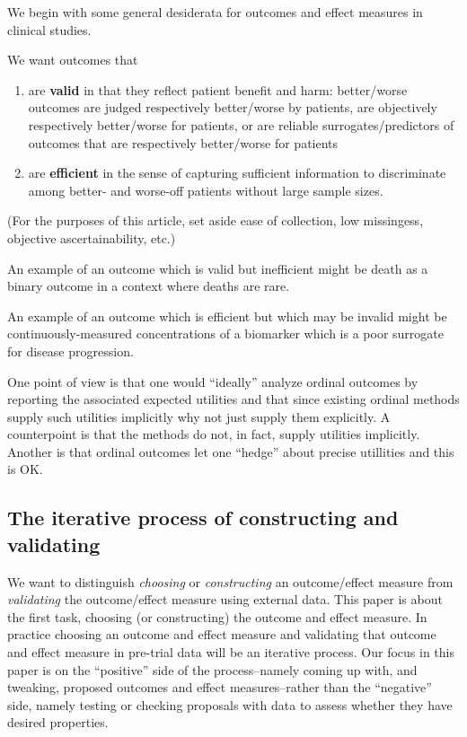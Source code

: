 \documentclass[
  11pt,
  fleqn
]{article}
\begin{document}
We begin with some general desiderata for outcomes and effect measures in
clinical studies.

We want outcomes that
\begin{enumerate}
  \item are \textbf{valid} in that they reflect patient benefit and harm:
    better/worse outcomes are judged respectively better/worse by patients, are
    objectively respectively better/worse for patients, or are reliable
    surrogates/predictors of outcomes that are respectively better/worse for
    patients
  \item are \textbf{efficient} in the sense of capturing
    sufficient information to
    discriminate among better- and worse-off patients without large
    sample sizes.
\end{enumerate}
(For the purposes of this article, set aside ease of collection, low
missingess, objective ascertainability, etc.)

An example of an outcome which is valid but inefficient might be
death as a binary outcome in a context where deaths
are rare.

An example of an outcome which is efficient but which may be invalid
might be continuously-measured concentrations of a biomarker which is a poor
surrogate for disease progression.

One point of view is that one would ``ideally'' analyze ordinal outcomes by
reporting the associated expected utilities  and that since existing ordinal methods supply
such utilities implicitly why not just supply them explicitly. A counterpoint
is that the methods do not, in fact, supply utilities implicitly.
Another is that ordinal outcomes let one ``hedge'' about precise
utillities and this is OK.

\subsection{The iterative process of constructing and validating}

We want to distinguish \emph{choosing} or \emph{constructing} an outcome/effect
measure from \emph{validating} the outcome/effect measure using external data.
This paper is about the first task, choosing (or constructing) the outcome and
effect measure. In practice choosing an outcome and effect measure and
validating that outcome and effect measure in pre-trial data will be an
iterative process. Our focus in this paper is on the ``positive'' side of the
process--namely coming up with, and tweaking, proposed outcomes and effect
measures--rather than the ``negative'' side, namely testing or checking
proposals with data to assess whether they have desired properties.
\end{document}
